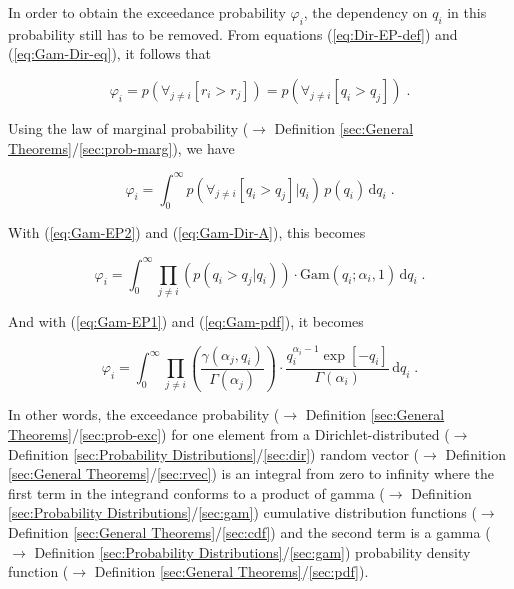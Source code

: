 \documentclass[a4paper,12pt,twoside]{book}
\begin{document}
In order to obtain the exceedance probability $\varphi_i$, the dependency on $q_i$ in this probability still has to be removed. From equations (\ref{eq:Dir-EP-def}) and (\ref{eq:Gam-Dir-eq}), it follows that

\begin{equation} \label{eq:dir-ep-Dir-EP2a}
\varphi_i = p(\forall_{j \neq i} \left[ r_i > r_j \right]) = p(\forall_{j \neq i} \left[ q_i > q_j \right]) \; .
\end{equation}

Using the law of marginal probability ($\rightarrow$ Definition \ref{sec:General Theorems}/\ref{sec:prob-marg}), we have

\begin{equation} \label{eq:dir-ep-Dir-EP2b}
\varphi_i = \int_0^\infty p(\forall_{j \neq i} \left[ q_i > q_j \right]|q_i) \, p(q_i) \, \mathrm{d}q_i \; .
\end{equation}

With (\ref{eq:Gam-EP2}) and (\ref{eq:Gam-Dir-A}), this becomes

\begin{equation} \label{eq:dir-ep-Dir-EP2c}
\varphi_i = \int_0^\infty \prod_{j \neq i} \left( p(q_i > q_j|q_i) \right) \cdot \mathrm{Gam}(q_i;\alpha_i,1) \, \mathrm{d}q_i \; .
\end{equation}

And with (\ref{eq:Gam-EP1}) and (\ref{eq:Gam-pdf}), it becomes

\begin{equation} \label{eq:dir-ep-Dir-EP-qed}
\varphi_i = \int_0^\infty \prod_{j \neq i} \left( \frac{\gamma(\alpha_j,q_i)}{\Gamma(\alpha_j)} \right) \cdot \frac{q_i^{\alpha_i-1} \exp[-q_i]}{\Gamma(\alpha_i)} \, \mathrm{d}q_i \; .
\end{equation}

In other words, the exceedance probability ($\rightarrow$ Definition \ref{sec:General Theorems}/\ref{sec:prob-exc}) for one element from a Dirichlet-distributed ($\rightarrow$ Definition \ref{sec:Probability Distributions}/\ref{sec:dir}) random vector ($\rightarrow$ Definition \ref{sec:General Theorems}/\ref{sec:rvec}) is an integral from zero to infinity where the first term in the integrand conforms to a product of gamma ($\rightarrow$ Definition \ref{sec:Probability Distributions}/\ref{sec:gam}) cumulative distribution functions ($\rightarrow$ Definition \ref{sec:General Theorems}/\ref{sec:cdf}) and the second term is a gamma ($\rightarrow$ Definition \ref{sec:Probability Distributions}/\ref{sec:gam}) probability density function ($\rightarrow$ Definition \ref{sec:General Theorems}/\ref{sec:pdf}).
\end{document}
